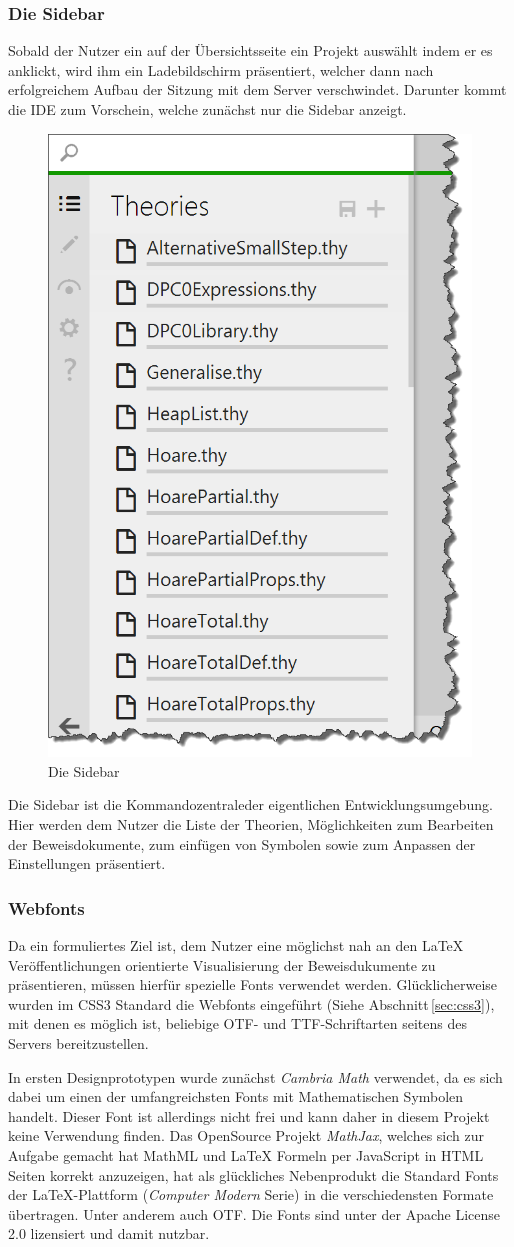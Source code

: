 \subsubsection{Die Sidebar}

Sobald der Nutzer ein auf der Übersichtsseite ein Projekt auswählt indem er es anklickt, wird ihm
ein Ladebildschirm präsentiert, welcher dann nach erfolgreichem Aufbau der Sitzung mit dem Server
verschwindet. Darunter kommt die IDE zum Vorschein, welche zunächst nur die Sidebar anzeigt.

\begin{figure}[!ht]
\centering
\includegraphics[width=0.4\linewidth]{images/screen-sidebar}
  \caption{Die Sidebar}
  \label{fig:screen-sidebar}
\end{figure}

Die Sidebar ist die \glqq Kommandozentrale\grqq der eigentlichen Entwicklungsumgebung. Hier werden
dem Nutzer die Liste der Theorien, Möglichkeiten zum Bearbeiten der Beweisdokumente, zum einfügen
von Symbolen sowie zum Anpassen der Einstellungen präsentiert.

\subsubsection{Webfonts}

Da ein formuliertes Ziel ist, dem Nutzer eine möglichst nah an den LaTeX Veröffentlichungen
orientierte Visualisierung der Beweisdukumente zu präsentieren, müssen hierfür spezielle Fonts
verwendet werden. Glücklicherweise wurden im CSS3 Standard die Webfonts eingeführt (Siehe
Abschnitt\,\ref{sec:css3}), mit denen es möglich ist, beliebige OTF- und TTF-Schriftarten seitens
des Servers bereitzustellen.

In ersten Designprototypen wurde zunächst \textit{Cambria Math} verwendet, da es sich dabei um einen
der umfangreichsten Fonts mit Mathematischen Symbolen handelt. Dieser Font ist allerdings nicht frei
und kann daher in diesem Projekt keine Verwendung finden. Das OpenSource Projekt \textit{MathJax},
welches sich zur Aufgabe gemacht hat MathML und LaTeX Formeln per JavaScript in HTML Seiten korrekt
anzuzeigen, hat als glückliches Nebenprodukt die Standard Fonts der LaTeX-Plattform
(\textit{Computer Modern} Serie) in die verschiedensten Formate übertragen. Unter anderem auch OTF.
Die Fonts sind unter der Apache License 2.0 lizensiert und damit nutzbar.


